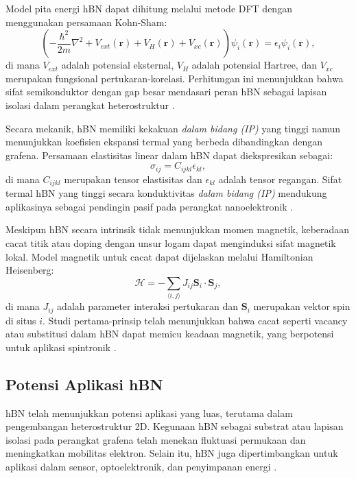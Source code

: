 Model pita energi hBN dapat dihitung melalui metode DFT dengan menggunakan persamaan Kohn-Sham:
\begin{equation}
    \left(-\frac{\hbar^2}{2m}\nabla^2 + V_{ext}(\mathbf{r}) + V_H(\mathbf{r}) + V_{xc}(\mathbf{r})\right)\psi_i(\mathbf{r}) = \epsilon_i \psi_i(\mathbf{r}),
\end{equation}
di mana \(V_{ext}\) adalah potensial eksternal, \(V_H\) adalah potensial Hartree, dan \(V_{xc}\) merupakan fungsional pertukaran-korelasi. Perhitungan ini menunjukkan bahwa sifat semikonduktor dengan gap besar mendasari peran hBN sebagai lapisan isolasi dalam perangkat heterostruktur \citep{garcia_defect_2015}.
 
Secara mekanik, hBN memiliki kekakuan \emph{dalam bidang (IP)} yang tinggi namun menunjukkan koefisien ekspansi termal yang berbeda dibandingkan dengan grafena. Persamaan elastisitas linear dalam hBN dapat diekspresikan sebagai:
\begin{equation}
    \sigma_{ij} = C_{ijkl}\epsilon_{kl},
\end{equation}
di mana \(C_{ijkl}\) merupakan tensor elastisitas dan \(\epsilon_{kl}\) adalah tensor regangan. Sifat termal hBN yang tinggi secara konduktivitas \emph{dalam bidang (IP)} mendukung aplikasinya sebagai pendingin pasif pada perangkat nanoelektronik \citep{zhang_point_2020}.
  
Meskipun hBN secara intrinsik tidak menunjukkan momen magnetik, keberadaan cacat titik atau doping dengan unsur logam dapat menginduksi sifat magnetik lokal. Model magnetik untuk cacat dapat dijelaskan melalui Hamiltonian Heisenberg:
\begin{equation}
    \mathcal{H} = -\sum_{\langle i,j \rangle} J_{ij} \mathbf{S}_i \cdot \mathbf{S}_j,
\end{equation}
di mana \(J_{ij}\) adalah parameter interaksi pertukaran dan \(\mathbf{S}_i\) merupakan vektor spin di situs \(i\). Studi pertama-prinsip telah menunjukkan bahwa cacat seperti vacancy atau substitusi dalam hBN dapat memicu keadaan magnetik, yang berpotensi untuk aplikasi spintronik \citep{zhang_point_2020}.

\subsection{Potensi Aplikasi hBN}
hBN telah menunjukkan potensi aplikasi yang luas, terutama dalam pengembangan heterostruktur 2D. Kegunaan hBN sebagai substrat atau lapisan isolasi pada perangkat grafena telah menekan fluktuasi permukaan dan meningkatkan mobilitas elektron. Selain itu, hBN juga dipertimbangkan untuk aplikasi dalam sensor, optoelektronik, dan penyimpanan energi \citep{zhang_electrical_2016}.
 
